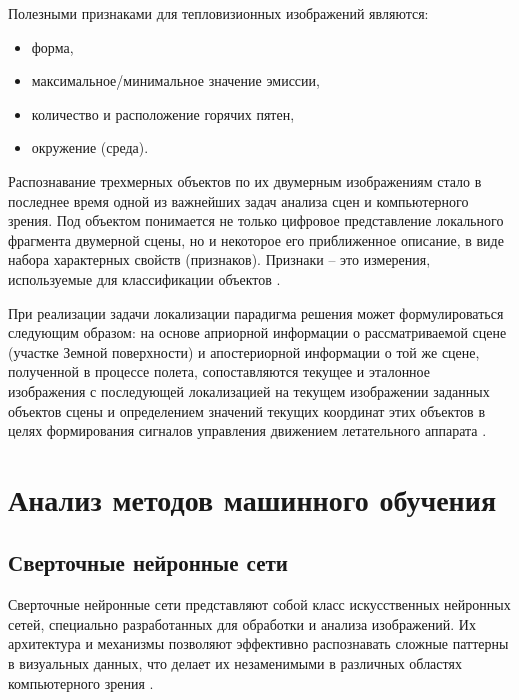Полезными признаками для тепловизионных изображений являются:
\begin{itemize}
    \item форма,
    \item  максимальное/минимальное значение эмиссии,
    \item  количество и расположение горячих пятен,
    \item окружение (среда). 
\end{itemize}

Распознавание трехмерных объектов по их двумерным изображениям стало в последнее время одной из важнейших задач анализа сцен и компьютерного зрения. Под объектом понимается не только цифровое представление локального фрагмента двумерной сцены, но и некоторое его приближенное описание, в виде набора характерных свойств (признаков). Признаки – это измерения, используемые для классификации объектов \cite{rasposnavanie}.

При реализации задачи локализации парадигма решения может формулироваться следующим образом: на основе априорной информации о рассматриваемой сцене (участке Земной поверхности) и апостериорной информации о той же сцене, полученной в процессе полета, сопоставляются текущее и эталонное изображения с последующей локализацией на текущем изображении заданных объектов сцены и определением значений текущих координат этих объектов в целях формирования сигналов управления движением летательного аппарата \cite{insarov}.

\section{Анализ методов машинного обучения}
\subsection{Сверточные нейронные сети}
Сверточные нейронные сети представляют собой класс искусственных нейронных сетей, специально разработанных для обработки и анализа изображений. Их архитектура и механизмы позволяют эффективно распознавать сложные паттерны в визуальных данных, что делает их незаменимыми в различных областях компьютерного зрения \cite{Krizhevsky2012ImageNetCW}.

